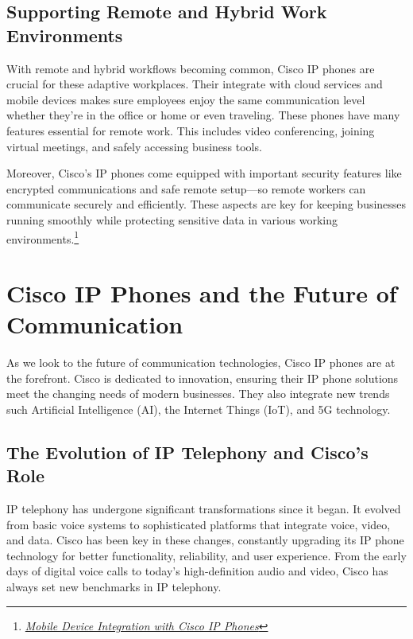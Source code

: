 \documentclass[11pt,a4paper]{article}
\begin{document}
\subsection*{Supporting Remote and Hybrid Work Environments}

With remote and hybrid workflows becoming common, Cisco IP phones are crucial for these adaptive workplaces. Their integrate with cloud services and mobile devices makes sure employees enjoy the same communication level whether they're in the office or home or even traveling. These phones have many features essential for remote work. This includes video conferencing, joining virtual meetings, and safely accessing business tools.

Moreover, Cisco's IP phones come equipped with important security features like encrypted communications and safe remote setup—so remote workers can communicate securely and efficiently. These aspects are key for keeping businesses running smoothly while protecting sensitive data in various working environments.\footnote{\href{https://www.cisco.com/c/dam/m/en_in/pdf/why-endpoint-security-remote.pdf}{\textit{Mobile Device Integration with Cisco IP Phones}}}


\section*{Cisco IP Phones and the Future of Communication}

As we look to the future of communication technologies, Cisco IP phones are at the forefront. Cisco is dedicated to innovation, ensuring their IP phone solutions meet the changing needs of modern businesses. They also integrate new trends such  Artificial Intelligence (AI), the Internet Things (IoT), and 5G technology.


\subsection*{The Evolution of IP Telephony and Cisco’s Role}

IP telephony has undergone significant transformations since it began. It evolved from basic voice systems to sophisticated platforms that integrate voice, video, and data. Cisco has been key in these changes, constantly upgrading its IP phone technology for better functionality, reliability, and user experience. From the early days of digital voice calls to today’s high-definition audio and video,
Cisco has always set new benchmarks in IP telephony.
\end{document}
